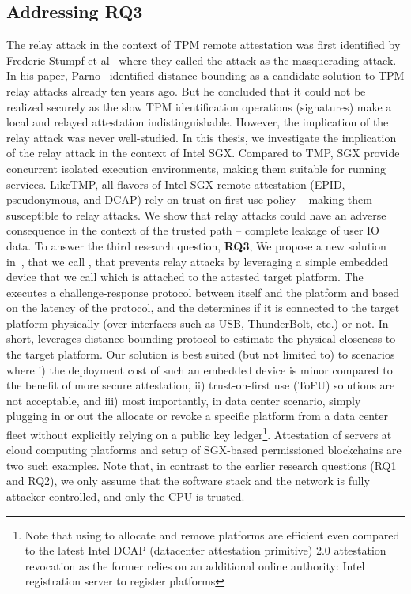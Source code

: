     \subsection{Addressing RQ3}

The relay attack in the context of TPM remote attestation was first identified by Frederic Stumpf et al~\cite{stumpf2006robust} where they called the attack as the masquerading attack. In his paper, Parno~\cite{parno2008bootstrapping} identified distance bounding as a candidate solution to TPM relay attacks already ten years ago. But he concluded that it could not be realized securely as the slow TPM identification operations (signatures) make a local and relayed attestation indistinguishable. However, the implication of the relay attack was never well-studied. In this thesis, we investigate the implication of the relay attack in the context of Intel SGX. Compared to TMP, SGX provide concurrent isolated execution environments, making them suitable for running services. LikeTMP, all flavors of Intel SGX remote attestation (EPID, pseudonymous, and DCAP) rely on trust on first use policy -- making them susceptible to relay attacks. We show that relay attacks could have an adverse consequence in the context of the trusted path -- complete leakage of user IO data. To answer the third research question, \textbf{RQ3},  We propose a new solution in~, that we call \proximitee, that prevents relay attacks by leveraging a simple embedded device that we call \deviceproximitee which is attached to the attested target platform. The \deviceproximitee executes a challenge-response protocol between itself and the platform and based on the latency of the protocol, and the \deviceproximitee determines if it is connected to the target platform physically (over interfaces such as USB, ThunderBolt, etc.) or not. In short, \deviceproximitee leverages distance bounding protocol to estimate the physical closeness to the target platform. Our solution is best suited (but not limited to) to scenarios where i) the deployment cost of such an embedded device is minor compared to the benefit of more secure attestation, ii) trust-on-first use (ToFU) solutions are not acceptable, and iii) most importantly, in data center scenario, simply plugging in or out the \deviceproximitee allocate or revoke a specific platform from a data center fleet without explicitly relying on a public key ledger\footnote{Note that using \proximitee to allocate and remove platforms are efficient even compared to the latest Intel DCAP (datacenter attestation primitive) 2.0 attestation revocation as the former relies on an additional online authority: Intel registration server to register platforms}. Attestation of servers at cloud computing platforms and setup of SGX-based permissioned blockchains are two such examples. Note that, in contrast to the earlier research questions (RQ1 and RQ2), we only assume that the software stack and the network is fully attacker-controlled, and only the CPU is trusted.



